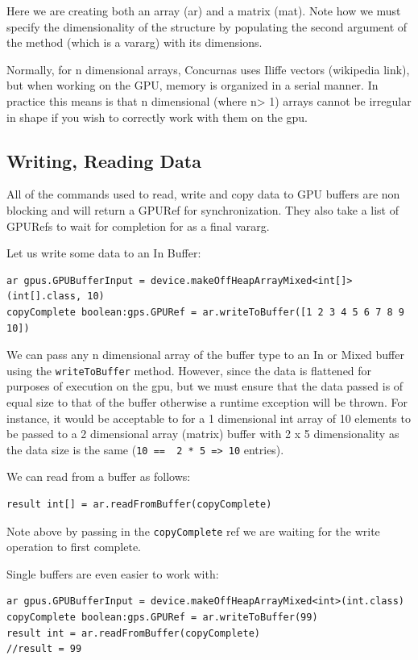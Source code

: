 \documentclass[conc-doc]{subfiles}
\begin{document}
Here we are creating both an array (ar) and a matrix (mat). Note how we must specify the dimensionality of the structure by populating the second argument of the method (which is a vararg) with its dimensions.

Normally, for n dimensional arrays, Concurnas uses Iliffe vectors (wikipedia link), but when working on the GPU, memory is organized in a serial manner. In practice this means is that n dimensional (where n> 1) arrays cannot be irregular in shape if you wish to correctly work with them on the gpu.

\subsection{Writing, Reading Data}
All of the commands used to read, write and copy data to GPU buffers are non blocking and will return a GPURef for synchronization. They also take a list of GPURefs to wait for completion for as a final vararg.

Let us write some data to an In Buffer:

\begin{lstlisting}
ar gpus.GPUBufferInput = device.makeOffHeapArrayMixed<int[]>(int[].class, 10)
copyComplete boolean:gps.GPURef = ar.writeToBuffer([1 2 3 4 5 6 7 8 9 10])
\end{lstlisting}

We can pass any n dimensional array of the buffer type to an In or Mixed buffer using the \lstinline{writeToBuffer} method. However, since the data is flattened for purposes of execution on the gpu, but we must ensure that the data passed is of equal size to that of the buffer otherwise a runtime exception will be thrown. For instance, it would be acceptable to for a 1 dimensional int array of 10 elements to be passed to a 2 dimensional array (matrix) buffer with 2 x 5 dimensionality as the data size is the same (\lstinline{10 ==  2 * 5 => 10} entries).

We can read from a buffer as follows:
\begin{lstlisting}
result int[] = ar.readFromBuffer(copyComplete)
\end{lstlisting}

Note above by passing in the \lstinline{copyComplete} ref we are waiting for the write operation to first complete.

Single buffers are even easier to work with:
\begin{lstlisting}
ar gpus.GPUBufferInput = device.makeOffHeapArrayMixed<int>(int.class)
copyComplete boolean:gps.GPURef = ar.writeToBuffer(99)
result int = ar.readFromBuffer(copyComplete)
//result = 99
\end{lstlisting}
\end{document}
